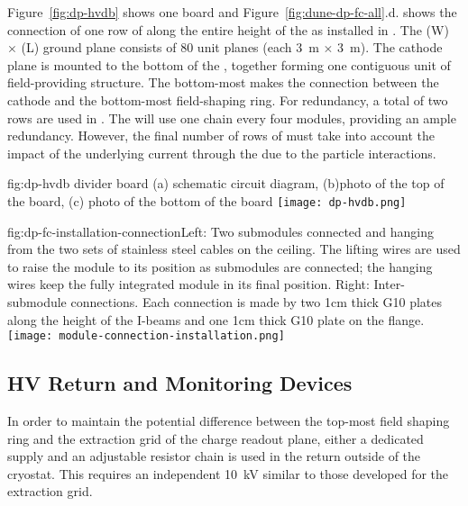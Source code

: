 Figure~\ref{fig:dp-hvdb} shows one  board and  Figure~\ref{fig:dune-dp-fc-all}.d. shows the connection of one row of  along the entire height of the  as installed in . The  \dptpcwdth (W) $\times$ \dptpclen (L) ground plane consists of \num{80} unit planes (each \SI{3}{\m} $\times$ \SI{3}{\m}).  
The cathode plane is mounted to the bottom of the , together forming one contiguous unit of field-providing structure.  The bottom-most  makes the connection between the cathode and the bottom-most field-shaping ring.
For redundancy, a total of two  rows are used in .  
The \dpmod will use one  chain every four  modules, providing an ample redundancy.  However, the final number of rows of  must take into account the impact of the underlying current through the  due to the particle interactions.


\begin{dunefigure}{fig:dp-hvdb}{  divider board (a) schematic circuit diagram, (b)photo of the top of the board, (c) photo of the bottom of the board}
\texttt{[image: dp-hvdb.png]}
\end{dunefigure}


\begin{dunefigure}{fig:dp-fc-installation-connection}{Left: Two submodules connected and hanging from the two sets of stainless steel cables on the ceiling.  The lifting wires are used to raise the module to its position as submodules are connected; the hanging wires keep the fully integrated module in its final position.  Right: Inter-submodule connections.  Each connection is made by two \num{1}{cm} thick G10 plates along the height of the I-beams and one \num{1}{cm} thick G10 plate on the flange.}
\texttt{[image: module-connection-installation.png]}
\end{dunefigure}


\subsection{HV Return and Monitoring Devices}

In order to maintain the potential difference between the top-most field shaping ring and the extraction grid of the charge readout plane, either a dedicated  supply and an adjustable resistor chain is used in the  return outside of the cryostat.  This requires an independent \SI{10}{kV} \fdth similar to those developed for the extraction grid.

